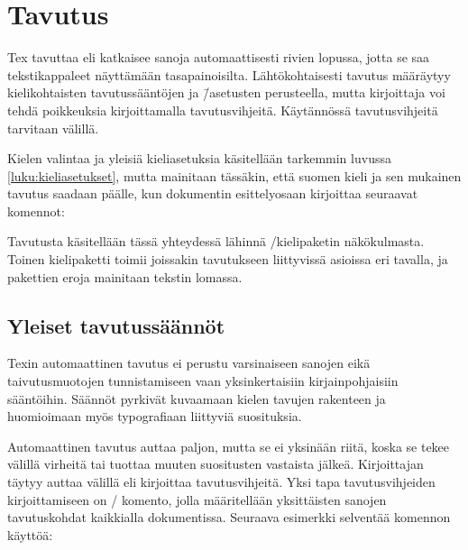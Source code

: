\section{Tavutus}
\label{luku:tavutus}

Tex tavuttaa eli katkaisee sanoja automaattisesti rivien lopussa, jotta
se saa tekstikappaleet näyttämään tasapainoisilta. Lähtökohtaisesti
tavutus määräytyy kielikohtaisten tavutussääntöjen ja \=/asetusten
perusteella, mutta kirjoittaja voi tehdä poikkeuksia kirjoittamalla
tavutusvihjeitä. Käytännössä tavutusvihjeitä tarvitaan välillä.

Kielen valintaa ja yleisiä kieliasetuksia käsitellään tarkemmin luvussa
\ref{luku:kieliasetukset}, mutta mainitaan tässäkin, että suomen kieli
ja sen mukainen tavutus saadaan päälle, kun dokumentin esittelyosaan
kirjoittaa seuraavat komennot:

\begin{koodilohkosis}
\usepackage{polyglossia}
\setdefaultlanguage{finnish}
\end{koodilohkosis}

Tavutusta käsitellään tässä yhteydessä lähinnä
\-/kielipaketin näkökulmasta. Toinen kielipaketti
 toimii joissakin tavutukseen liittyvissä asioissa eri
tavalla, ja pakettien eroja mainitaan tekstin lomassa.

\subsection{Yleiset tavutussäännöt}

Texin automaattinen tavutus ei perustu varsinaiseen sanojen eikä
taivutusmuotojen tunnistamiseen vaan yksinkertaisiin kirjainpohjaisiin
sääntöihin. Säännöt pyrkivät kuvaamaan kielen tavujen rakenteen ja
huomioimaan myös typografiaan liittyviä suosituksia.

Automaattinen tavutus auttaa paljon, mutta se ei yksinään riitä, koska
se tekee välillä virheitä tai tuottaa muuten suositusten vastaista
jälkeä. Kirjoittajan täytyy auttaa välillä eli kirjoittaa
tavutusvihjeitä. Yksi tapa tavutusvihjeiden kirjoittamiseen on
\-/ komento, jolla määritellään yksittäisten
sanojen tavutuskohdat kaikkialla dokumentissa. Seuraava esimerkki
selventää komennon käyttöä:

\begin{koodilohkosis}
\end{koodilohkosis}


